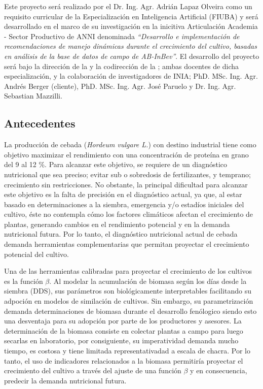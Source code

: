 \documentclass[
11pt, %
]{charter}
\begin{document}
Este proyecto será realizado por el Dr. Ing. Agr. Adrián Lapaz Olveira como un requisito curricular de la Especialización en Inteligencia Artificial (FIUBA) y será desarrollado en el marco de su investigación en la inicitiva Articulación Academia - Sector Productivo de ANNI denominada \emph{“Desarrollo e implementación de recomendaciones de manejo dinámicas durante el crecimiento del cultivo, basadas en análisis de la base de datos de campo de AB-InBev”}. El desarrollo del proyecto será bajo la dirección de la \supname y la codirección de la \cosupname; ambas docentes de dicha especialización, y la colaboración de investigadores de INIA; PhD. MSc. Ing. Agr. Andrés Berger (cliente), PhD. MSc. Ing. Agr. José Paruelo y Dr. Ing. Agr. Sebastian Mazzilli.

\subsection{Antecedentes}
\label{sec:descripcion}
La producción de cebada (\emph{Hordeum vulgare L.}) con destino industrial tiene como objetivo maximizar el rendimiento con una concentración de proteína en grano del 9 al 12 \%. Para alcanzar este objetivo, se requiere de un diagnóstico nutricional que sea preciso; evitar sub o sobredosis de fertilizantes, y temprano; crecimiento sin restricciones. No obstante, la principal dificultad para alcanzar este objetivo es la falta de precisión en el diagnóstico actual, ya que, al estar basado en determinaciones a la siembra, emergencia y/o estadíos iniciales del cultivo, éste no contempla cómo los factores climáticos afectan el crecimiento de plantas, generando cambios en el rendimiento potencial y en la demanda nutricional futura. Por lo tanto, el diagnóstico nutricional actual de cebada demanda herramientas complementarias que permitan proyectar el crecimiento potencial del cultivo. 

Una de las herramientas calibradas para proyectar el crecimiento de los cultivos es la función $\beta$. Al modelar la acumulación de biomasa según los días desde la siembra (DDS), sus parámetros son biológicamente interpretables facilitando su adpoción en modelos de similación de cultivos. Sin embargo, su parametrización demanda determinaciones de biomasa durante el desarrollo fenólogico siendo esto una desventaja para su adopción por parte de los productores y asesores. La determinación de la biomasa consiste en colectar plantas a campo para luego secarlas en laboratorio, por consiguiente, su imperatividad demanda mucho tiempo, es costosa y tiene limitada representativadad a escala de chacra. Por lo tanto, el uso de indicadores relacionados a la biomasa permitiría proyectar el crecimiento del cultivo a través del ajuste de una función $\beta$ y en consecuencia, predecir la demanda nutricional futura.
\end{document}
